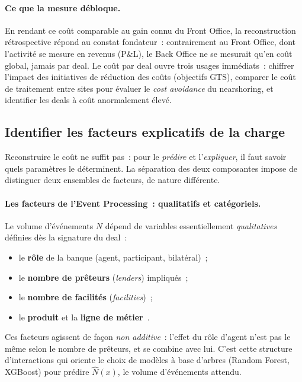 \paragraph{Ce que la mesure débloque.}
En rendant ce coût comparable au gain connu du Front Office, la reconstruction rétrospective répond au constat fondateur~: contrairement au Front Office, dont l'activité se mesure en revenus (P\&L), le Back Office ne se mesurait qu'en coût global, jamais par deal. Le coût par deal ouvre trois usages immédiats~: chiffrer l'impact des initiatives de réduction des coûts (objectifs GTS), comparer le coût de traitement entre sites pour évaluer le \textit{cost avoidance} du nearshoring, et identifier les deals à coût anormalement élevé.

\subsection{Identifier les facteurs explicatifs de la charge}
\label{sec:facteurs}

Reconstruire le coût ne suffit pas~: pour le \emph{prédire} et l'\emph{expliquer}, il faut savoir quels paramètres le déterminent. La séparation des deux composantes impose de distinguer deux ensembles de facteurs, de nature différente.

\paragraph{Les facteurs de l'Event Processing~: qualitatifs et catégoriels.}
Le volume d'événements $N$ dépend de variables essentiellement \emph{qualitatives} définies dès la signature du deal~:
\begin{itemize}
    \item le \textbf{rôle} de la banque (agent, participant, bilatéral)~;
    \item le \textbf{nombre de prêteurs} (\textit{lenders}) impliqués~;
    \item le \textbf{nombre de facilités} (\textit{facilities})~;
    \item le \textbf{produit} et la \textbf{ligne de métier}~.
\end{itemize}
Ces facteurs agissent de façon \emph{non additive}~: l'effet du rôle d'agent n'est pas le même selon le nombre de prêteurs, et se combine avec lui. C'est cette structure d'interactions qui oriente le choix de modèles à base d'arbres (Random Forest, XGBoost) pour prédire $\hat{N}(x)$, le volume d'événements attendu.



